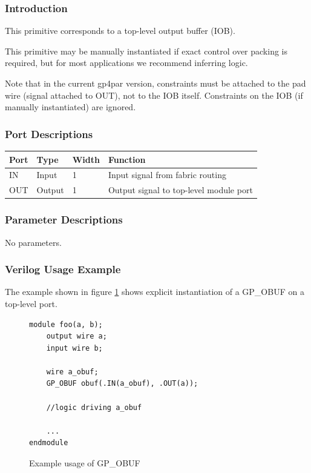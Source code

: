 \documentclass[11pt]{article}
\begin{document}
\subsubsection{Introduction}
This primitive corresponds to a top-level output buffer (IOB).

This primitive may be manually instantiated if exact control over packing is required, but for most applications we 
recommend inferring logic.

Note that in the current gp4par version, constraints must be attached to the pad wire (signal attached to OUT), not 
to the IOB itself. Constraints on the IOB (if manually instantiated) are ignored.

\subsubsection{Port Descriptions}

\begin{tabularx}{4in}{|l|l|l|X|}
\hline
{\bfseries Port} & {\bfseries Type} & {\bfseries Width} & {\bfseries Function} \\
\hline
IN & Input & 1 & Input signal from fabric routing \\
\hline
OUT & Output & 1 & Output signal to top-level module port \\
\hline
\end{tabularx}

\subsubsection{Parameter Descriptions}

No parameters.

\subsubsection{Verilog Usage Example}

The example shown in figure \ref{gp-obuf-example} shows explicit instantiation of a GP\_OBUF on a top-level port.

\begin{figure}[h]
\begin{lstlisting}
module foo(a, b);
	output wire a;
	input wire b;
	
	wire a_obuf;
	GP_OBUF obuf(.IN(a_obuf), .OUT(a));
	
	//logic driving a_obuf
	
	...
endmodule
\end{lstlisting}
\caption{Example usage of GP\_OBUF}
\label{gp-obuf-example}
\end{figure}
\end{document}
